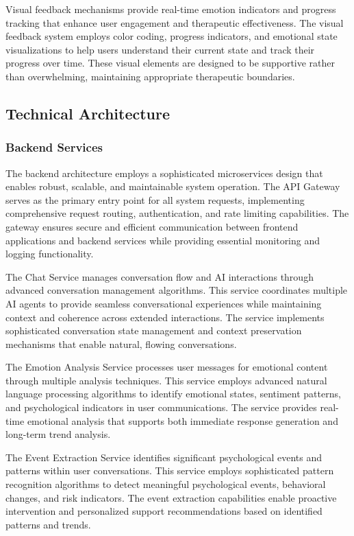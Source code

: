 Visual feedback mechanisms provide real-time emotion indicators and progress tracking that enhance user engagement and therapeutic effectiveness. The visual feedback system employs color coding, progress indicators, and emotional state visualizations to help users understand their current state and track their progress over time. These visual elements are designed to be supportive rather than overwhelming, maintaining appropriate therapeutic boundaries.

\subsection{Technical Architecture}

\subsubsection{Backend Services}

The backend architecture employs a sophisticated microservices design that enables robust, scalable, and maintainable system operation. The API Gateway serves as the primary entry point for all system requests, implementing comprehensive request routing, authentication, and rate limiting capabilities. The gateway ensures secure and efficient communication between frontend applications and backend services while providing essential monitoring and logging functionality.

The Chat Service manages conversation flow and AI interactions through advanced conversation management algorithms. This service coordinates multiple AI agents to provide seamless conversational experiences while maintaining context and coherence across extended interactions. The service implements sophisticated conversation state management and context preservation mechanisms that enable natural, flowing conversations.

The Emotion Analysis Service processes user messages for emotional content through multiple analysis techniques. This service employs advanced natural language processing algorithms to identify emotional states, sentiment patterns, and psychological indicators in user communications. The service provides real-time emotional analysis that supports both immediate response generation and long-term trend analysis.

The Event Extraction Service identifies significant psychological events and patterns within user conversations. This service employs sophisticated pattern recognition algorithms to detect meaningful psychological events, behavioral changes, and risk indicators. The event extraction capabilities enable proactive intervention and personalized support recommendations based on identified patterns and trends.

